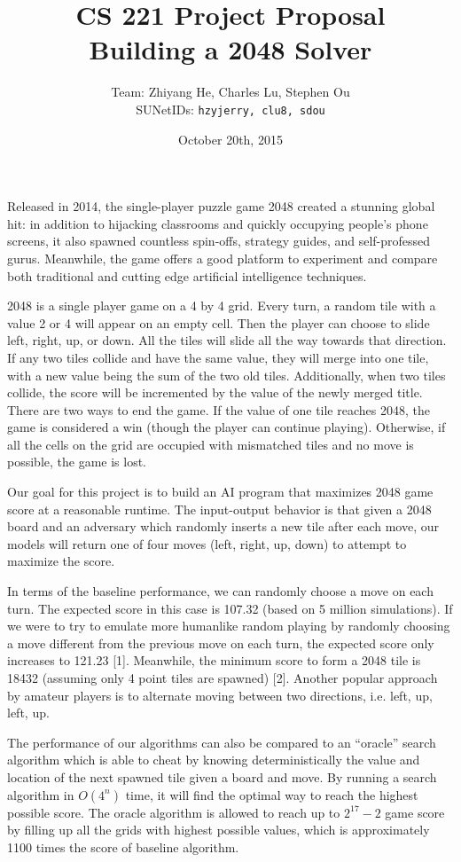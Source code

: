 \documentclass[11pt]{article}
\title{CS 221 Project Proposal \\ Building a 2048 Solver}
\author{Team: Zhiyang He, Charles Lu, Stephen Ou \\ SUNetIDs: \texttt{hzyjerry, clu8, sdou}}
\date{October 20th, 2015}
\begin{document}
\maketitle

Released in 2014, the single-player puzzle game 2048 created a stunning global hit: in addition to hijacking classrooms and quickly occupying people’s phone screens, it also spawned countless spin-offs, strategy guides, and self-professed gurus. Meanwhile, the game offers a good platform to experiment and compare both traditional and cutting edge artificial intelligence techniques.

2048 is a single player game on a 4 by 4 grid. Every turn, a random tile with a value 2 or 4 will appear on an empty cell. Then the player can choose to slide left, right, up, or down. All the tiles will slide all the way towards that direction. If any two tiles collide and have the same value, they will merge into one tile, with a new value being the sum of the two old tiles. Additionally, when two tiles collide, the score will be incremented by the value of the newly merged title. There are two ways to end the game. If the value of one tile reaches 2048, the game is considered a win (though the player can continue playing). Otherwise, if all the cells on the grid are occupied with mismatched tiles and no move is possible, the game is lost.

Our goal for this project is to build an AI program that maximizes 2048 game score at a reasonable runtime. The input-output behavior is that given a 2048 board and an adversary which randomly inserts a new tile after each move, our models will return one of four moves (left, right, up, down) to attempt to maximize the score.

In terms of the baseline performance, we can randomly choose a move on each turn. The expected score in this case is 107.32 (based on 5 million simulations). If we were to try to emulate more humanlike random playing by randomly choosing a move different from the previous move on each turn, the expected score only increases to 121.23 [1]. Meanwhile, the minimum score to form a 2048 tile is 18432 (assuming only 4 point tiles are spawned) [2]. Another popular approach by amateur players is to alternate moving between two directions, i.e. left, up, left, up. 

The performance of our algorithms can also be compared to an “oracle” search algorithm which is able to cheat by knowing deterministically the value and location of the next spawned tile given a board and move. By running a search algorithm in $O(4^n)$ time, it will find the optimal way to reach the highest possible score. The oracle algorithm is allowed to reach up to $2^{17} - 2$ game score by filling up all the grids with highest possible values, which is approximately 1100 times the score of baseline algorithm.
\end{document}
